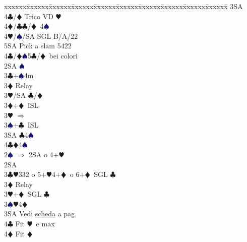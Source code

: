 \documentclass[a4paper,italian]{article}
\newcommand{\BC}{\textcolor{OliveGreen}{$\clubsuit$}}
\newcommand{\BD}{\textcolor{RedOrange}{$\vardiamondsuit$}}
\newcommand{\BH}{\textcolor{Red2}{$\varheartsuit${}}}
\newcommand{\BS}{\textcolor{MidnightBlue}{$\spadesuit${}}}
\newenvironment{bidtable}
{\begin{tabbing}

    xxxxxx\=xxxxxx\=xxxxxx\=xxxxxx\=xxxxxx\=xxxxxx\=xxxxxx\=xxxxxx\=xxxxxx\=xxxxxx\=\kill}
{\end{tabbing} }%
\begin{document}
\begin{multicols}{2}
\begin{bidtable}
                                            3SA\+\\
                                            4\BC/\BD \> Trico VD \BH \\
                                            4\BD/\BC {}\BC /\BD\ 4\BS \\
                                            4\BH/\BS/SA \>\> SGL B/A/22\\
                                            5SA \> Pick a slam 5422\-\-\\
                                            4\BC/\BD {}\BS 5\BC /\BD\ bei colori\-\\
                                            2SA \BS \+\\
                                            3\BC {}+\BS 4m\+\\
                                            3\BD \> Relay\+\\
                                            3\BH/SA \BC /\BD \-\-\\
                                            3\BD {}+\BD\ ISL\\
                                            3\BH \> $\Rightarrow$\\
                                            3\BS {}+\BC\ ISL\\
                                            3SA \BC 4\BS \\
                                            4\BC {}\BD 4\BS \-\-\\
                                            2\BS \> $\Rightarrow$ 2SA o 4+\BH \+\\
                                            2SA\+\\
                                            3\BC {}\BH 332 o 5+\BH 4+\BD\ o 6+\BD\ SGL \BC \+\\
                                            3\BD \> Relay\+\\
                                            3\BH {}+\BD\ SGL \BC \\
                                            3\BS {}\BH 4\BD \+\\
                                            3SA\> Vedi \hyperref[Riapertura3SA]{scheda} a pag. \pageref{Riapertura3SA}\\
                                            4\BC\> Fit \BH\ e max\\
                                            4\BD\> Fit \BD\\

\end{bidtable}
\end{multicols}
\end{document}
